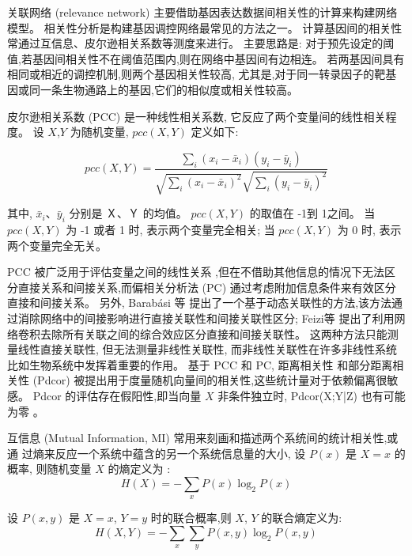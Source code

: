 关联网络 (relevance network) 主要借助基因表达数据间相关性的计算来构建网络模型。
相关性分析是构建基因调控网络最常见的方法之一。
计算基因间的相关性常通过互信息、皮尔逊相关系数等测度来进行。
主要思路是: 对于预先设定的阈值,若基因间相关性不在阈值范围内,则在网络中基因间有边相连。
若两基因间具有相同或相近的调控机制,则两个基因相关性较高,
尤其是,对于同一转录因子的靶基因或同一条生物通路上的基因,它们的相似度或相关性较高。

皮尔逊相关系数 (PCC) 是一种线性相关系数, 它反应了两个变量间的线性相关程度。
设 $X$,$Y$ 为随机变量, $pcc(X,Y)$ 定义如下:

\begin{equation}
pcc(X,Y) = \frac{{\sum\limits_i {(x_i -\bar x_i )(y_i -\bar y_i )} }}{{\sqrt {\sum\limits_i {(x_i  - \bar x_i )^2 } } \sqrt {\sum\limits_i {(y_i  - \bar y_i )^2 } } }}
\end{equation}

其中, $\bar x_i$、$\bar y_i$ 分别是 Ｘ、Ｙ 的均值。
 $pcc(X,Y)$ 的取值在 -1到 1之间。
当 $pcc(X,Y)$ 为 -1 或者 1 时, 表示两个变量完全相关;
当 $pcc(X,Y)$ 为 0 时, 表示两个变量完全无关。

PCC 被广泛用于评估变量之间的线性关系 \cite{stuart2003gene},但在不借助其他信息的情况下无法区分直接关系和间接关系,而偏相关分析法 (PC) \cite{baba2004partial} 通过考虑附加信息条件来有效区分直接和间接关系。
另外, Barabási 等 \cite{barzel2013network} 提出了一个基于动态关联性的方法,该方法通过消除网络中的间接影响进行直接关联性和间接关联性区分; 
Feizi等 \cite{feizi2013network} 提出了利用网络卷积去除所有关联之间的综合效应区分直接和间接关联性。
这两种方法只能测量线性直接关联性,
但无法测量非线性关联性, 而非线性关联性在许多非线性系统比如生物系统中发挥着重要的作用。
基于 PCC 和 PC, 距离相关性 \cite{szekely2007measuring,kosorok2009brownian} 和部分距离相关性 (Pdcor) \cite{szekely2014partial} 被提出用于度量随机向量间的相关性,这些统计量对于依赖偏离很敏感。
Pdcor 的评估存在假阳性,即当向量 $X$ 非条件独立时, Pdcor(X;Y|Z) 也有可能为零 \cite{szekely2014partial}。

互信息 (Mutual Information, MI) 常用来刻画和描述两个系统间的统计相关性,或通
过熵来反应一个系统中蕴含的另一个系统信息量的大小, 设 $P(x)$ 是 $X=x$ 的概率,
则随机变量 $X$ 的熵定义为 \cite{cover2012elements}:
\begin{equation}
    H(X) = - \sum\limits_x {P(x)\log _2 P(x)} 
\end{equation}

设 $P(x,y)$ 是 $X=x$, $Y=y$ 时的联合概率,则 $X$, $Y$ 的联合熵定义为:
\begin{equation}
    H(X,Y) =  - \sum\limits_x {\sum\limits_y {P(x,y)\log _2 P(x,y)} } 
\end{equation}

